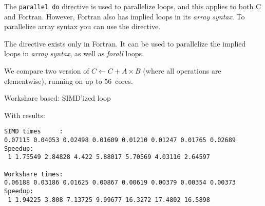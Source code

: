 The \lstinline{parallel do} directive is used to parallelize loops,
and this applies to both C and Fortran. However, Fortran also
has implied loops in its \emph{array syntax}.
To parallelize array syntax you can use the 
directive.

The  directive exists only in Fortran.
It can be used to parallelize
the implied loops in \emph{array syntax},
as well as  \emph{forall} loops.

We compare two version of $C\leftarrow C+A\times B$
(where all operations are elementwise),
running on 
up to 56~cores.

\begin{multicols}{2}
  Workshare based:
  \columnbreak
  SIMD'ized loop
\end{multicols}

With results:

\begin{verbatim}
SIMD times     :
0.07115 0.04053 0.02498 0.01609 0.01210 0.01247 0.01765 0.02689
Speedup:
 1 1.75549 2.84828 4.422 5.88017 5.70569 4.03116 2.64597

Workshare times:
0.06188 0.03186 0.01625 0.00867 0.00619 0.00379 0.00354 0.00373
Speedup:
 1 1.94225 3.808 7.13725 9.99677 16.3272 17.4802 16.5898  
\end{verbatim}
